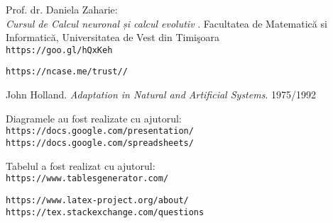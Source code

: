 \begin{thebibliography}{99}
Prof. dr. Daniela Zaharie:\\
\textit{Cursul de Calcul neuronal și calcul evolutiv}
. Facultatea de Matematică si Informatică, Universitatea de Vest din Timişoara
\\\texttt{https://goo.gl/hQxKeh}

\texttt{https://ncase.me/trust//}

John Holland. 
\textit{Adaptation in Natural and Artificial Systems}. 1975/1992

 Diagramele au fost realizate cu ajutorul:
\\\texttt{https://docs.google.com/presentation/}
\\\texttt{https://docs.google.com/spreadsheets/}

 Tabelul a fost realizat cu ajutorul:
\\\texttt{https://www.tablesgenerator.com/}

\texttt{https://www.latex-project.org/about/}\\
\texttt{https://tex.stackexchange.com/questions}

\end{thebibliography}